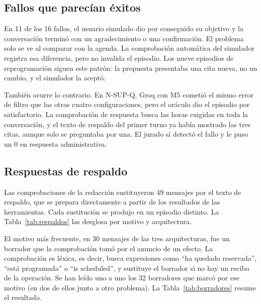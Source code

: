 \subsection{Fallos que parecían éxitos}
\label{sec:resultados-cierres}

En 11 de los 16 fallos, el usuario simulado dio por conseguido su objetivo y la
conversación terminó con un agradecimiento o una confirmación. El problema solo
se ve al comparar con la agenda. La comprobación automática del simulador
registra esa diferencia, pero no invalida el episodio. Los nueve episodios de
reprogramación siguen este patrón: la propuesta presentaba una cita nueva, no
un cambio, y el simulador la aceptó.

También ocurre lo contrario. En N-SUP-Q, Groq con M5 cometió el mismo error de
filtro que las otras cuatro configuraciones, pero el oráculo dio el episodio
por satisfactorio. La comprobación de respuesta busca las horas exigidas en
toda la conversación, y el texto de respaldo del primer turno ya había mostrado
las tres citas, aunque solo se preguntaba por una. El jurado sí detectó el
fallo y le puso un 0 en respuesta administrativa.

\subsection{Respuestas de respaldo}
\label{sec:resultados-respaldos}

Las comprobaciones de la redacción sustituyeron 49 mensajes por el texto de
respaldo, que se prepara directamente a partir de los resultados de las
herramientas. Cada sustitución se produjo en un episodio distinto. La
Tabla~\ref{tab:respaldos} las desglosa por motivo y arquitectura.

\begin{table}[!htbp]
\centering
\small
\caption[Mensajes sustituidos por el texto de respaldo.]{Mensajes sustituidos
por el texto de respaldo, por motivo y arquitectura.}
\label{tab:respaldos}

\end{table}

El motivo más frecuente, en 30 mensajes de las tres arquitecturas, fue un
borrador que la comprobación tomó por el anuncio de un efecto. La comprobación
es léxica, es decir, busca expresiones como \enquote{ha quedado reservada},
\enquote{está programada} o \enquote{is scheduled}, y sustituye el borrador si
no hay un recibo de la operación. Se han leído uno a uno los 32 borradores que
marcó por ese motivo (en dos de ellos junto a otro problema). La
Tabla~\ref{tab:borradores} resume el resultado.

